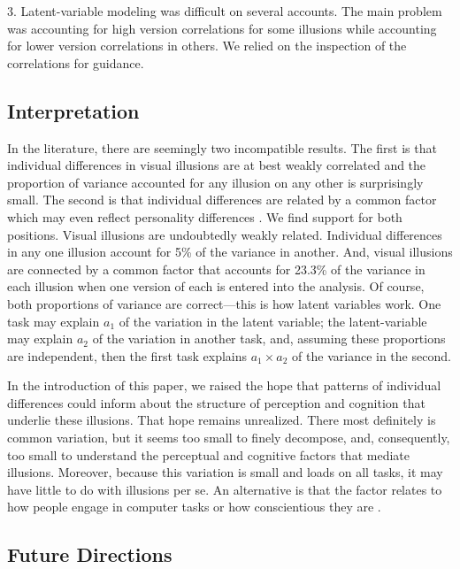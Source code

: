 3. Latent-variable modeling was difficult on several accounts.  The main problem was accounting for high version correlations for some illusions while accounting for lower version correlations in others.  We relied on the inspection of the correlations for guidance.

\subsection{Interpretation}

In the literature, there are seemingly two incompatible results.  The first is that individual differences in visual illusions are at best weakly correlated \parencite{Cretenoud.etal.2019} and the proportion of variance accounted for any illusion on any other is surprisingly small.  The second is that individual differences are related by a common factor which may even reflect personality differences \parencite[]{Makowski.etal.2023}.  We find support for both positions.  Visual illusions are undoubtedly weakly related.   Individual differences in any one illusion account for 5\% of the variance in another.   And, visual illusions are connected by a common factor that accounts for 23.3\% of the variance in each illusion when one version of each is entered into the analysis.  Of course, both proportions of variance are correct---this is how latent variables work.  One task may explain $a_1$ of the variation in the latent variable; the latent-variable may explain $a_2$ of the variation in another task, and, assuming these proportions are independent, then the first task explains $a_1\times a_2$ of the variance in the second.

In the introduction of this paper, we raised the hope that patterns of individual differences could inform about the structure of perception and cognition that underlie these illusions.  That hope remains unrealized.  There most definitely is common variation, but it seems too small to finely decompose, and, consequently, too small to understand the perceptual and cognitive factors that mediate illusions.  Moreover, because this variation is small and loads on all tasks, it may have little to do with illusions per se.  An alternative is that the factor relates to how people engage in computer tasks or how conscientious they are \parencite{Makowski.etal.2023}.  


\subsection{Future Directions}

